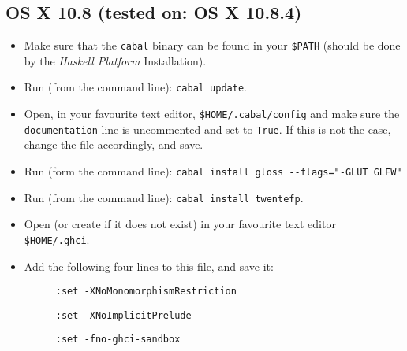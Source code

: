 \documentclass[]{article}
\begin{document}
\subsection{OS X 10.8 (tested on: OS X 10.8.4)}
\begin{itemize}
  \item Make sure that the \texttt{cabal} binary can be found in your \texttt{\$PATH} (should be done by the \emph{Haskell Platform} Installation).
  \item Run (from the command line): \texttt{cabal update}.
  \item Open, in your favourite text editor, \texttt{\$HOME/.cabal/config} and make sure the \texttt{documentation} line is uncommented and set to \texttt{True}. If this is not the case, change the file accordingly, and save.
  \item Run (form the command line): \texttt{cabal install gloss -{}-flags="-GLUT GLFW"}
  \item Run (from the command line): \texttt{cabal install twentefp}.
  \item Open (or create if it does not exist) in your favourite text editor \texttt{\$HOME/.ghci}.
  \item Add the following four lines to this file, and save it:
  \begin{description}
    \item[] \texttt{:set -XNoMonomorphismRestriction}
    \item[] \texttt{:set -XNoImplicitPrelude}
    \item[] \texttt{:set -fno-ghci-sandbox}
  \end{description}
\end{itemize}
\end{document}
